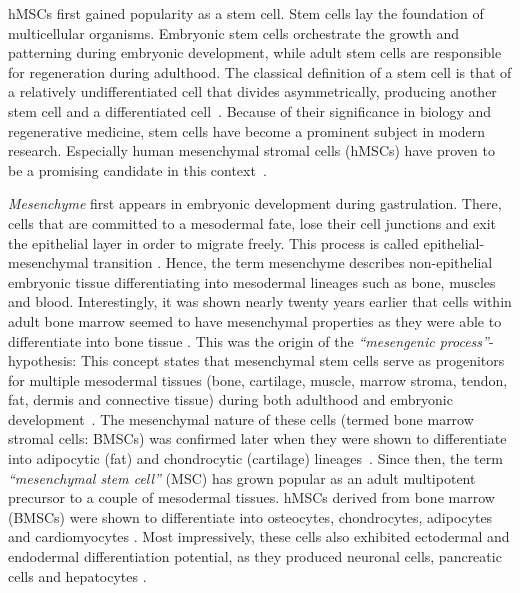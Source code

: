 hMSCs first gained popularity as a stem cell. Stem cells lay the foundation of
multicellular organisms. Embryonic stem cells orchestrate the growth and
patterning during embryonic development, while adult stem cells are responsible
for regeneration during adulthood. The classical definition of a stem cell is
that of a relatively undifferentiated cell that divides asymmetrically,
producing another stem cell and a differentiated
cell~\cite{cooperCellMolecularApproach2000, shenghuiMechanismsStemCell2009}.
Because of their significance in biology and regenerative medicine, stem cells
have become a prominent subject in modern research. Especially human mesenchymal
stromal cells (hMSCs) have proven to be a promising candidate in this
context~\cite{ullahHumanMesenchymalStem2015}.

\emph{Mesenchyme} first appears in embryonic development during gastrulation.
There, cells that are committed to a mesodermal fate, lose their cell junctions
and exit the epithelial layer in order to migrate freely. This process is called
epithelial-mesenchymal transition
\cite{tamFormationMesodermalTissues1987,nowotschinCellularDynamicsEarly2010}.
Hence, the term mesenchyme describes non-epithelial embryonic tissue
differentiating into mesodermal lineages such as bone, muscles and blood.
Interestingly, it was shown nearly twenty years earlier that cells within adult
bone marrow seemed to have mesenchymal properties as they were able to
differentiate into bone tissue
\cite{friedensteinOsteogenesisTransplantsBone1966,
    friedensteinOsteogenicPrecursorCells1971, biancoMesenchymalStemCells2014}. This
was the origin of the \emph{``mesengenic process''}-hypothesis: This concept
states that mesenchymal stem cells serve as progenitors for multiple mesodermal
tissues (bone, cartilage, muscle, marrow stroma, tendon, fat, dermis and
connective tissue) during both adulthood and embryonic
development~\cite{caplanMesenchymalStemCells1991,caplanMesengenicProcess1994}.
The mesenchymal nature of these cells (termed bone marrow stromal cells: BMSCs)
was confirmed later when they were shown to differentiate into adipocytic (fat)
and chondrocytic (cartilage)
lineages~\cite{pittengerMultilineagePotentialAdult1999}. Since then, the term
\emph{``mesenchymal stem cell''} (MSC) has grown popular as an adult multipotent
precursor to a couple of mesodermal tissues. hMSCs derived from bone marrow
(BMSCs) were shown to differentiate into osteocytes, chondrocytes, adipocytes
and cardiomyocytes \cite{gronthosSTRO1FractionAdult1994,
    muruganandanAdipocyteDifferentiationBone2009, xuMesenchymalStemCells2004}. Most
impressively, these cells also exhibited ectodermal and endodermal
differentiation potential, as they produced neuronal cells, pancreatic cells and
hepatocytes \cite{barzilayLentiviralDeliveryLMX1a2009,
    wilkinsHumanBoneMarrowderived2009, gabrInsulinproducingCellsAdult2013,
    stockHumanBoneMarrow2014}.

